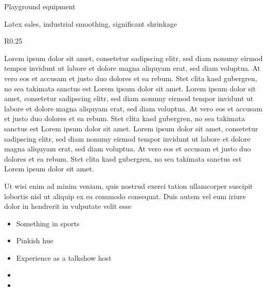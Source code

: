 \documentclass[english]{tithesisnotice}
\begin{document}
Playground equipment

Latex sales, industrial smoothing, significant shrinkage

\begin{wrapfigure}{R}{0.25\textwidth}
  \begin{center}
  \end{center}
\end{wrapfigure}
Lorem ipsum dolor sit amet, consetetur sadipscing elitr, sed diam nonumy eirmod
tempor invidunt ut labore et dolore magna aliquyam erat, sed diam voluptua. At
vero eos et accusam et justo duo dolores et ea rebum. Stet clita kasd
gubergren, no sea takimata sanctus est Lorem ipsum dolor sit amet. Lorem ipsum
dolor sit amet, consetetur sadipscing elitr, sed diam nonumy eirmod tempor
invidunt ut labore et dolore magna aliquyam erat, sed diam voluptua. At vero
eos et accusam et justo duo dolores et ea rebum. Stet clita kasd gubergren, no
sea takimata sanctus est Lorem ipsum dolor sit amet. Lorem ipsum dolor sit
amet, consetetur sadipscing elitr, sed diam nonumy eirmod tempor invidunt ut
labore et dolore magna aliquyam erat, sed diam voluptua. At vero eos et accusam
et justo duo dolores et ea rebum. Stet clita kasd gubergren, no sea takimata
sanctus est Lorem ipsum dolor sit amet.

Ut wisi enim ad minim veniam, quis nostrud exerci tation ullamcorper suscipit
lobortis nisl ut aliquip ex ea commodo consequat. Duis autem vel eum iriure
dolor in hendrerit in vulputate velit esse

\begin{itemize}
  \item Something in sports
  \item Pinkish hue
  \item Experience as a talkshow host
\end{itemize}

\begin{itemize}
  \item {}
  \item {}
\end{itemize}
\end{document}
